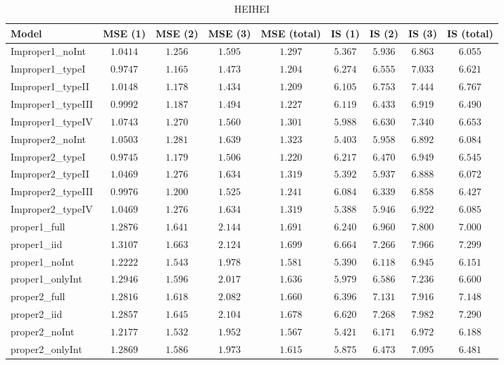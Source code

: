 \begin{table}

\caption{\label{tab:model-choice-sc3}HEIHEI}
\centering
\begin{tabular}{lcccccccc}
\hline
Model  & MSE (1) & MSE (2) & MSE (3) & MSE (total) & IS (1) & IS (2) & IS (3) & \multicolumn{1}{c}{IS (total)} \\ 
\hline
Improper1_noInt  & $1.0414$ & $1.256$ & $1.595$ & $1.297$ & $5.367$ & $5.936$ & $6.863$ & $6.055$ \\
Improper1_typeI  & $0.9747$ & $1.165$ & $1.473$ & $1.204$ & $6.274$ & $6.555$ & $7.033$ & $6.621$ \\
Improper1_typeII  & $1.0148$ & $1.178$ & $1.434$ & $1.209$ & $6.105$ & $6.753$ & $7.444$ & $6.767$ \\
Improper1_typeIII  & $0.9992$ & $1.187$ & $1.494$ & $1.227$ & $6.119$ & $6.433$ & $6.919$ & $6.490$ \\
Improper1_typeIV  & $1.0743$ & $1.270$ & $1.560$ & $1.301$ & $5.988$ & $6.630$ & $7.340$ & $6.653$ \\
Improper2_noInt  & $1.0503$ & $1.281$ & $1.639$ & $1.323$ & $5.403$ & $5.958$ & $6.892$ & $6.084$ \\
Improper2_typeI  & $0.9745$ & $1.179$ & $1.506$ & $1.220$ & $6.217$ & $6.470$ & $6.949$ & $6.545$ \\
Improper2_typeII  & $1.0469$ & $1.276$ & $1.634$ & $1.319$ & $5.392$ & $5.937$ & $6.888$ & $6.072$ \\
Improper2_typeIII  & $0.9976$ & $1.200$ & $1.525$ & $1.241$ & $6.084$ & $6.339$ & $6.858$ & $6.427$ \\
Improper2_typeIV  & $1.0469$ & $1.276$ & $1.634$ & $1.319$ & $5.388$ & $5.946$ & $6.922$ & $6.085$ \\
proper1_full  & $1.2876$ & $1.641$ & $2.144$ & $1.691$ & $6.240$ & $6.960$ & $7.800$ & $7.000$ \\
proper1_iid  & $1.3107$ & $1.663$ & $2.124$ & $1.699$ & $6.664$ & $7.266$ & $7.966$ & $7.299$ \\
proper1_noInt  & $1.2222$ & $1.543$ & $1.978$ & $1.581$ & $5.390$ & $6.118$ & $6.945$ & $6.151$ \\
proper1_onlyInt  & $1.2946$ & $1.596$ & $2.017$ & $1.636$ & $5.979$ & $6.586$ & $7.236$ & $6.600$ \\
proper2_full  & $1.2816$ & $1.618$ & $2.082$ & $1.660$ & $6.396$ & $7.131$ & $7.916$ & $7.148$ \\
proper2_iid  & $1.2857$ & $1.645$ & $2.104$ & $1.678$ & $6.620$ & $7.268$ & $7.982$ & $7.290$ \\
proper2_noInt  & $1.2177$ & $1.532$ & $1.952$ & $1.567$ & $5.421$ & $6.171$ & $6.972$ & $6.188$ \\
proper2_onlyInt  & $1.2869$ & $1.586$ & $1.973$ & $1.615$ & $5.875$ & $6.473$ & $7.095$ & $6.481$ \\
\hline 
\end{tabular}


\end{table}